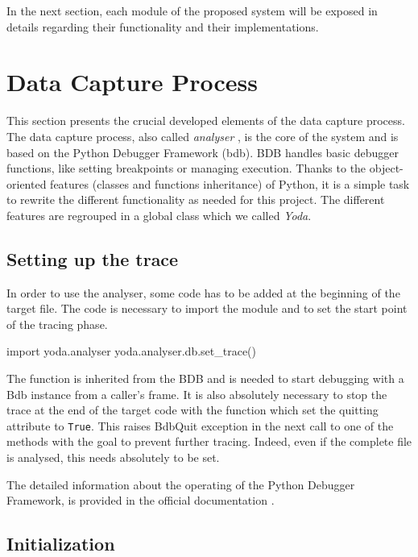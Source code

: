 In the next section, each module of the proposed system will be exposed in details regarding their functionality and their implementations.

\section{Data Capture Process}
This section presents the crucial developed elements of the data capture process. The data capture process, also called \textit{analyser} , is the core of the system and is based on the Python Debugger Framework (\gls{bdb}). BDB handles basic debugger functions, like setting breakpoints or managing execution. Thanks to the object-oriented features (classes and functions inheritance) of Python, it is a simple task to rewrite the different functionality as needed for this project. The different features are regrouped in a global class which we called \textit{Yoda}.


\subsection{Setting up the trace}
In order to use the analyser, some code has to be added at the beginning of the target file. The code is necessary to import the module and to set the start point of the tracing phase. 
\begin{python}
import yoda.analyser
yoda.analyser.db.set_trace()
\end{python}

The  function is inherited from the BDB and is needed to start debugging with a Bdb instance from a caller’s frame.
It is also absolutely necessary to stop the trace at the end of the target code with the  function which set the quitting attribute to \texttt{True}. This raises BdbQuit exception in the next call to one of the  methods with the goal to prevent further tracing. Indeed, even if the complete file is analysed, this needs absolutely to be set. 

The detailed information about the operating of the Python Debugger Framework, is provided in the official documentation \citep{Foundation2017}.

\subsection{Initialization}

